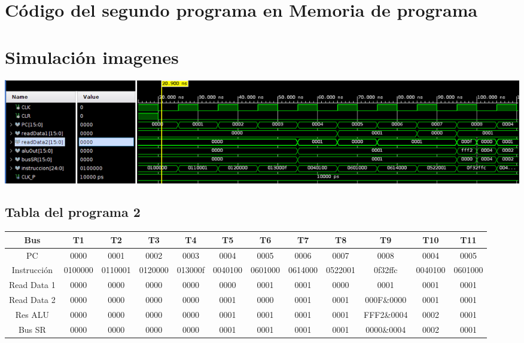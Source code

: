 \documentclass[8pt,executivepaper]{article}
\begin{document}
\section{Código del segundo programa en Memoria de programa}
\begin{center}
  
\end{center}
\section{Simulación imagenes}
\begin{center}
  \includegraphics[scale=0.35]{img/programa1-0.png}
\end{center}
\begin{landscape}
  \section{Tabla del programa 2}
  \begin{tabular}{|c|c|c|c|c|c|c|c|c|c|c|c|}
    \hline
    Bus & T1 & T2 & T3 & T4 & T5 & T6 & T7 & T8 & T9 & T10 & T11\\
    \hline
    PC & 0000 & 0001 & 0002 & 0003 & 0004 & 0005 & 0006 & 0007 & 0008 & 0004 & 0005 \\
    \hline
    Instrucción & 0100000 & 0110001 & 0120000 & 013000f & 0040100 & 0601000 & 0614000 & 0522001 & 0f32ffc & 0040100 & 0601000 \\
    \hline
    Read Data 1 & 0000 & 0000 & 0000 & 0000 & 0000 & 0001 & 0001 & 0000 & 0001 & 0001 & 0001\\
    \hline
    Read Data 2 & 0000 & 0000 & 0000 & 0000 & 0001 & 0000 & 0001 & 0001 & 000F\&0000 & 0001 & 0001\\
    \hline
    Res ALU & 0000 & 0000 & 0000 & 0000 & 0001 & 0001 & 0001 & 0001 & FFF2\&0004 & 0002 & 0001 \\
    \hline
    Bus SR & 0000 & 0000 & 0000 & 0000 & 0001 & 0001 & 0001 & 0001 & 0000\&0004 & 0002 & 0001 \\
    \hline
  \end{tabular}
\end{landscape}
\end{document}

